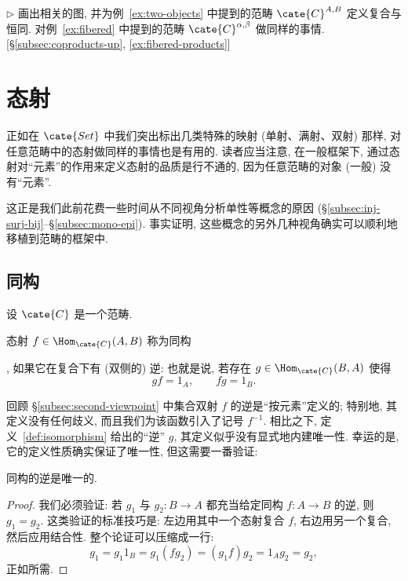 \begin{prob}
\label{ex:dual-two-objects}
$\triangleright$ 画出相关的图, 并为例~\ref{ex:two-objects} 中提到的范畴 $\cate{C}^{A,B}$ 定义复合与恒同. 对例~\ref{ex:fibered} 中提到的范畴 $\cate{C}^{\alpha,\beta}$ 做同样的事情. [\S\ref{subsec:coproducts-up}, \ref{ex:fibered-products}]
\end{prob}

\section{态射}
\label{sec:morphisms}

正如在 $\cate{Set}$ 中我们突出标出几类特殊的映射 (单射、满射、双射) 那样, 对任意范畴中的态射做同样的事情也是有用的. 读者应当注意, 在一般框架下, 通过态射对``元素''的作用来定义态射的品质是行不通的, 因为任意范畴的对象 (一般) 没有``元素''.

这正是我们此前花费一些时间从不同视角分析单性等概念的原因 (\S\ref{subsec:inj-surj-bij}--\S\ref{subsec:mono-epi}). 事实证明, 这些概念的另外几种视角确实可以顺利地移植到范畴的框架中.

\subsection{同构}
\label{subsec:isomorphisms}

设 $\cate{C}$ 是一个范畴.

\begin{definition}
\label{def:isomorphism}
态射 $f \in \Hom_{\cate{C}}(A, B)$ 称为同构%

, 如果它在复合下有 (双侧的) 逆: 也就是说, 若存在 $g \in \Hom_{\cate{C}}(B, A)$ 使得
\[
gf = 1_A, \qquad fg = 1_B.
\]
\end{definition}

回顾 \S\ref{subsec:second-viewpoint} 中集合双射 $f$ 的逆是``按元素''定义的; 特别地, 其定义没有任何歧义, 而且我们为该函数引入了记号 $f^{-1}$. 相比之下, 定义~\ref{def:isomorphism} 给出的``逆'' $g$, 其定义似乎没有显式地内建唯一性. 幸运的是, 它的定义性质确实保证了唯一性, 但这需要一番验证:

\begin{proposition}
\label{prop:inverse-unique}
同构的逆是唯一的.
\end{proposition}

\begin{proof}
我们必须验证: 若 $g_1$ 与 $g_2 : B \to A$ 都充当给定同构 $f : A \to B$ 的逆, 则 $g_1 = g_2$. 这类验证的标准技巧是: 左边用其中一个态射复合 $f$, 右边用另一个复合, 然后应用结合性. 整个论证可以压缩成一行:
\[
g_1 = g_1 1_B = g_1 (f g_2) = (g_1 f) g_2 = 1_A g_2 = g_2,
\]
正如所需.
\end{proof}

